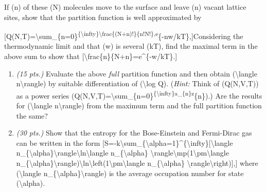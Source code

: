 If (n) of these (N) molecules move to the surface and leave (n) vacant lattice sites, show that the partition function is well approximated by

[Q(N,T)=\textbackslash{}sum\_\{n=0\}\textsuperscript{\{\textbackslash{}infty\}\textbackslash{}frac\{(N+n)!\}\{n!N!\},e}\{-nw\slash{}kT\},]Considering the thermodynamic limit and that (w) is several (kT), find the maximal term in the above sum to show that [\textbackslash{}frac\{n\}\{N+n\}=e\^{}\{-w\slash{}kT\}.]

\begin{enumerate}
\item \emph{(15 pts.)} Evaluate the above \emph{full} partition function and then obtain (\textbackslash{}langle n\textbackslash{}rangle) by suitable differentiation of (\textbackslash{}log Q). (\emph{Hint:} Think of (Q(N,V,T)) as a power series (Q(N,V,T)=\textbackslash{}sum\_\{n=0\}\textsuperscript{\{\textbackslash{}infty\}a\_\{n\}z}\{n\}).) Are the results for (\textbackslash{}langle n\textbackslash{}rangle) from the maximum term and the full partition function the same?

\item \emph{(30 pts.)} Show that the entropy for the Bose-Einstein and Fermi-Dirac gas can be written in the form [S=-k\textbackslash{}sum\_\{\textbackslash{}alpha=1\}\^{}\{\textbackslash{}infty\}{[\textbackslash{}langle n\_\{\textbackslash{}alpha\}\textbackslash{}rangle\textbackslash{}ln\textbackslash{}langle n\_\{\textbackslash{}alpha\} \textbackslash{}rangle\textbackslash{}mp(1\textbackslash{}pm\textbackslash{}langle n\_\{\textbackslash{}alpha\}\textbackslash{}rangle)\textbackslash{}ln\textbackslash{}left(1\textbackslash{}pm\textbackslash{}langle n\_\{\textbackslash{}alpha\} \textbackslash{}rangle\textbackslash{}right)]},] where (\textbackslash{}langle n\_\{\textbackslash{}alpha\}\textbackslash{}rangle) is the average occupation number for state (\textbackslash{}alpha).

\end{enumerate}
